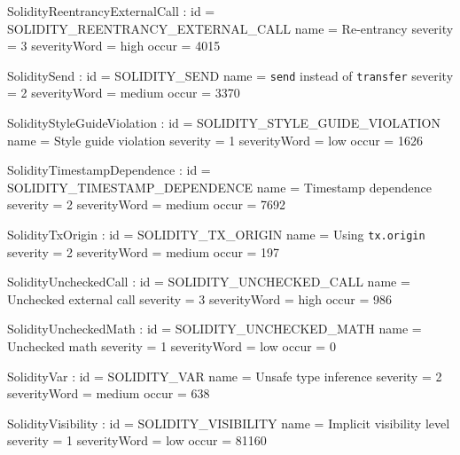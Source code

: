 \setparameter SolidityReentrancyExternalCall :
id 				= SOLIDITY\_REENTRANCY\_EXTERNAL\_CALL
name 			= {Re-entrancy}
severity 		= 3
severityWord 	= high
occur			= 4015

\setparameter SoliditySend :
id 				= SOLIDITY\_SEND
name 			= {\texttt{send} instead of \texttt{transfer}}
severity 		= 2
severityWord 	= medium
occur			= 3370

\setparameter SolidityStyleGuideViolation :
id 				= SOLIDITY\_STYLE\_GUIDE\_VIOLATION
name 			= {Style guide violation}
severity 		= 1
severityWord 	= low
occur			= 1626

\setparameter SolidityTimestampDependence :
id 				= SOLIDITY\_TIMESTAMP\_DEPENDENCE
name 			= {Timestamp dependence}
severity 		= 2
severityWord 	= medium
occur			= 7692

\setparameter SolidityTxOrigin :
id 				= SOLIDITY\_TX\_ORIGIN
name 			= {Using \texttt{tx.origin}}
severity 		= 2
severityWord 	= medium
occur			= 197

\setparameter SolidityUncheckedCall :
id 				= SOLIDITY\_UNCHECKED\_CALL
name 			= {Unchecked external call}
severity 		= 3
severityWord 	= high
occur			= 986

\setparameter SolidityUncheckedMath :
id 				= SOLIDITY\_UNCHECKED\_MATH
name 			= {Unchecked math}
severity 		= 1
severityWord 	= low
occur			= 0

\setparameter SolidityVar :
id 				= SOLIDITY\_VAR
name 			= {Unsafe type inference}
severity 		= 2
severityWord 	= medium
occur			= 638

\setparameter SolidityVisibility :
id 				= SOLIDITY\_VISIBILITY
name 			= {Implicit visibility level}
severity 		= 1
severityWord 	= low
occur			= 81160

\let\letcs\etoolboxletcs %
